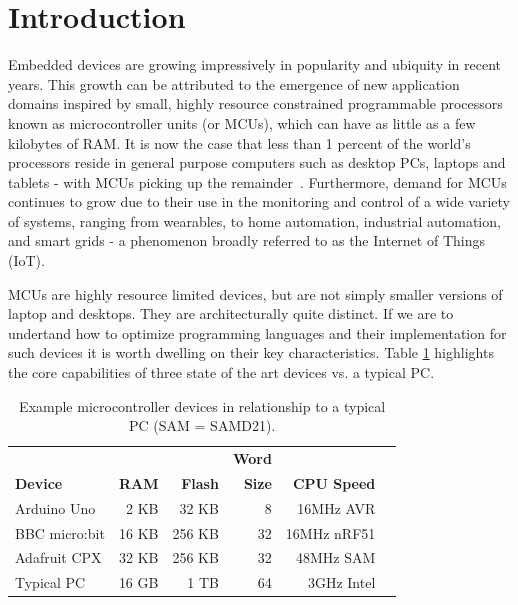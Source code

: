 \section{Introduction}
\label{sec:intro}

Embedded devices are growing impressively in popularity and ubiquity in recent years.
This growth can be attributed to the emergence of new application domains inspired by small,
highly resource constrained programmable processors known as microcontroller units (or MCUs),
which can have as little as a few kilobytes of RAM. It is now the case that less than 1 percent of
the world's processors reside in general purpose computers such as desktop PCs, laptops and tablets
- with MCUs picking up the remainder~\cite{borriello2000embedded}.
Furthermore, demand for MCUs continues to grow due to their use in the monitoring and
control of a wide variety of systems, ranging from wearables, to home automation,
industrial automation, and smart grids - a phenomenon broadly referred to as the Internet of Things (IoT).

MCUs are highly resource limited devices, but are not simply smaller versions of laptop and desktops.
They are architecturally quite distinct. If we are to undertand how to optimize
programming languages and their implementation for such devices it is worth dwelling on their key characteristics.
Table \ref{table:devices} highlights the core capabilities of three state of the art devices vs. a typical PC.

\begin{table}[]
    \centering
    \begin{tabular}{|l|r|r|r|r|r|}
    \hline
                           &          &              & \bf{Word}  &                 \\
    \bf{Device}            & \bf{RAM} & \bf{Flash}   & \bf{Size}  & \bf{CPU Speed}  \\ \hline
    Arduino Uno            & 2 KB       & 32 KB      & 8          & 16MHz AVR       \\ \hline
    BBC micro:bit          & 16 KB      & 256 KB     & 32         & 16MHz nRF51     \\ \hline
    Adafruit CPX           & 32 KB      & 256 KB     & 32         & 48MHz SAM    \\ \hline
    Typical PC             & 16 GB      & 1 TB       & 64         & 3GHz Intel      \\ \hline
    \end{tabular}
    \caption{\label{table:devices}Example microcontroller devices in relationship to a typical PC (SAM = SAMD21).}
    \end{table}

